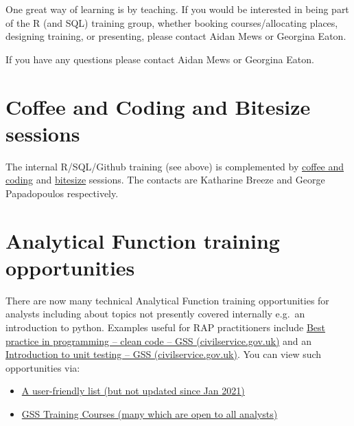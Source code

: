 \documentclass[
]{book}
\providecommand{\tightlist}{%
  \setlength{\itemsep}{0pt}\setlength{\parskip}{0pt}}
\begin{document}
One great way of learning is by teaching. If you would be interested in being part of the R (and SQL) training group, whether booking courses/allocating places, designing training, or presenting, please contact Aidan Mews or Georgina Eaton.

If you have any questions please contact Aidan Mews or Georgina Eaton.

\hypertarget{coffee-and-coding-and-bitesize-sessions}{%
\section{Coffee and Coding and Bitesize sessions}\label{coffee-and-coding-and-bitesize-sessions}}

The internal R/SQL/Github training (see above) is complemented by \href{https://web.microsoftstream.com/channel/f6aa6c5d-e90c-44b7-8ccc-28a318fa0630}{coffee and coding} and \href{https://web.microsoftstream.com/channel/5a6012a2-efd6-4b86-902d-98c864427caa}{bitesize} sessions. The contacts are Katharine Breeze and George Papadopoulos respectively.

\hypertarget{analytical-function-training-opportunities}{%
\section{Analytical Function training opportunities}\label{analytical-function-training-opportunities}}

There are now many technical Analytical Function training opportunities for analysts including about topics not presently covered internally e.g.~an introduction to python. Examples useful for RAP practitioners include \href{https://gss.civilservice.gov.uk/training/best-practice-in-programming-clean-code/}{Best practice in programming -- clean code -- GSS (civilservice.gov.uk)} and an \href{Introduction\%20to\%20unit\%20testing\%20–\%20GSS\%20(civilservice.gov.uk)}{Introduction to unit testing -- GSS (civilservice.gov.uk)}. You can view such opportunities via:

\begin{itemize}
\tightlist
\item
  \href{https://www.gov.uk/guidance/af-learning-curriculum-technical}{A user-friendly list (but not updated since Jan 2021)}
\item
  \href{https://gss.civilservice.gov.uk/training-courses/}{GSS Training Courses (many which are open to all analysts)}
\end{itemize}
\end{document}
